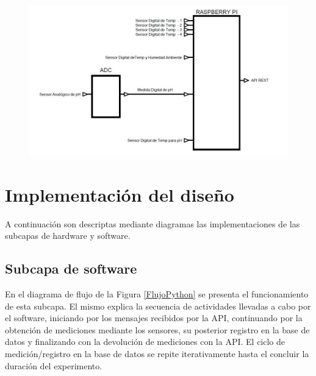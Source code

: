                 \begin{figure}[h]
                    \centering
                    \includegraphics[scale=0.65]{EsquemaDesigndeHardware.jpg}
                    \label{fig:EsquemaHardware}            
                \end{figure} \hfill \break
        
\section{Implementación del diseño}
    \par A continuación son descriptas mediante diagramas las implementaciones de las subcapas de hardware y software.
  
    \subsection{Subcapa de software}
        \par En el diagrama de flujo de la Figura \ref{FlujoPython} se presenta el funcionamiento de esta subcapa. El mismo explica la secuencia de actividades llevadas a cabo por el software, iniciando por los mensajes recibidos por la API, continuando por la obtención de mediciones mediante los sensores, su posterior registro en la base de datos y finalizando con la devolución de mediciones con la API. El ciclo de medición/registro en la base de datos se repite iterativamente hasta el concluir la duración del experimento.

